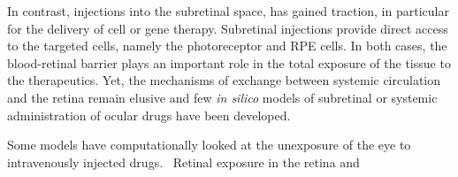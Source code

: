 \documentclass[12pt,a4paper]{journal}
\begin{document}
In contrast, injections into the subretinal space, has gained traction, in particular for the delivery of cell or gene therapy.
Subretinal injections provide direct access to the targeted cells, namely the photoreceptor and RPE cells.
In both cases, the blood-retinal barrier plays an important role in the total exposure of the tissue to the therapeutics.
Yet, the mechanisms of exchange between systemic circulation and the retina remain elusive and few \textit{in silico} models of subretinal or systemic administration of ocular drugs have been developed.





Some models have computationally looked at the unexposure of the eye to intravenously injected drugs.~\cite{Shivva_2021,Vellonen_2015}
Retinal exposure in the retina and 




\end{document}
